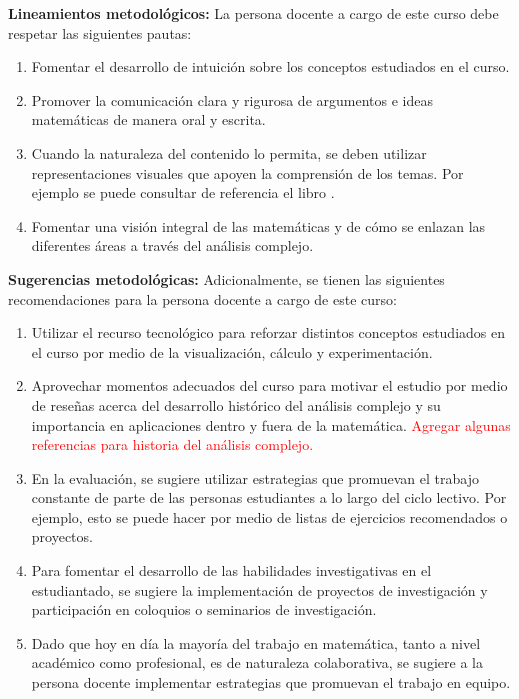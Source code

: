 \begin{refsection}
\noindent \textbf{Lineamientos metodológicos:} La persona docente a cargo de este curso debe respetar las siguientes pautas:
\begin{enumerate}
    \item Fomentar el desarrollo de intuición sobre los conceptos estudiados en el curso.
    \item Promover la comunicación clara y rigurosa de argumentos e ideas matemáticas de manera oral y escrita.
    \item Cuando la naturaleza del contenido lo permita, se deben utilizar representaciones visuales que apoyen la comprensión de los temas. Por ejemplo se puede consultar de referencia el libro \cite{Nee23}.
    \item Fomentar una visión integral de las matemáticas y de cómo se enlazan las diferentes áreas a través del análisis complejo.
\end{enumerate}

\textbf{Sugerencias metodológicas:} Adicionalmente, se tienen las siguientes recomendaciones para la persona docente a cargo de este curso:
\begin{enumerate}
    \item Utilizar el recurso tecnológico para reforzar distintos conceptos estudiados en el curso por medio de la visualización, cálculo y experimentación.
    \item Aprovechar momentos adecuados del curso para motivar el estudio por medio de reseñas acerca del desarrollo histórico del análisis complejo y su importancia en aplicaciones dentro y fuera de la matemática. \textcolor{red}{Agregar algunas referencias para historia del análisis complejo.}
    \item En la evaluación, se sugiere utilizar estrategias que promuevan el trabajo constante de parte de las personas estudiantes a lo largo del ciclo lectivo. Por ejemplo, esto se puede hacer por medio de listas de ejercicios recomendados o proyectos.
    \item Para fomentar el desarrollo de las habilidades investigativas en el estudiantado, se sugiere la implementación de proyectos de investigación y participación en coloquios o seminarios de investigación.
    \item Dado que hoy en día la mayoría del trabajo en matemática, tanto a nivel académico como profesional, es de naturaleza colaborativa, se sugiere a la persona docente implementar estrategias que promuevan el trabajo en equipo.
\end{enumerate}


\nocite{AF03}
\nocite{AF21}
\nocite{Ahl21}
\nocite{Apo76}
\nocite{BN10}
\nocite{Boa10}
\nocite{Con78}
\nocite{Con95}
\nocite{GK06} 
\nocite{Lan99}
\nocite{Kra08}
\nocite{Nee23}
\nocite{Pri03}
\nocite{SS203}




\printcursosbibliography
\end{refsection}
